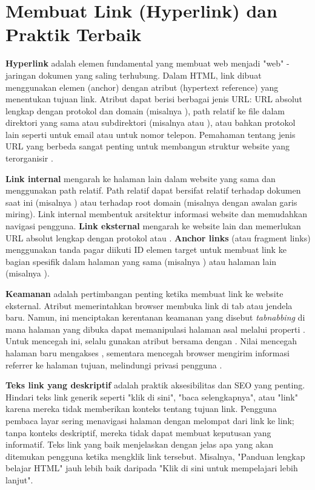 ﻿\section{Membuat Link (Hyperlink) dan Praktik Terbaik}

\textbf{Hyperlink} adalah elemen fundamental yang membuat web menjadi "web" - jaringan dokumen yang saling terhubung. Dalam HTML, link dibuat menggunakan elemen  (anchor) dengan atribut  (hypertext reference) yang menentukan tujuan link. Atribut  dapat berisi berbagai jenis URL: URL absolut lengkap dengan protokol dan domain (misalnya ), path relatif ke file dalam direktori yang sama atau subdirektori (misalnya  atau ), atau bahkan protokol lain seperti  untuk email atau  untuk nomor telepon. Pemahaman tentang jenis URL yang berbeda sangat penting untuk membangun struktur website yang terorganisir \cite{webdevHtml}.

\textbf{Link internal} mengarah ke halaman lain dalam website yang sama dan menggunakan path relatif. Path relatif dapat bersifat relatif terhadap dokumen saat ini (misalnya ) atau terhadap root domain (misalnya  dengan awalan garis miring). Link internal membentuk arsitektur informasi website dan memudahkan navigasi pengguna. \textbf{Link eksternal} mengarah ke website lain dan memerlukan URL absolut lengkap dengan protokol  atau . \textbf{Anchor links} (atau fragment links) menggunakan tanda pagar \code{\#} diikuti ID elemen target untuk membuat link ke bagian spesifik dalam halaman yang sama (misalnya ) atau halaman lain (misalnya ).

\textbf{Keamanan} adalah pertimbangan penting ketika membuat link ke website eksternal. Atribut  memerintahkan browser membuka link di tab atau jendela baru. Namun, ini menciptakan kerentanan keamanan yang disebut \textit{tabnabbing} di mana halaman yang dibuka dapat memanipulasi halaman asal melalui properti . Untuk mencegah ini, selalu gunakan atribut  bersama dengan . Nilai  mencegah halaman baru mengakses , sementara  mencegah browser mengirim informasi referrer ke halaman tujuan, melindungi privasi pengguna \cite{mdnHtmlIntro}.

\textbf{Teks link yang deskriptif} adalah praktik aksesibilitas dan SEO yang penting. Hindari teks link generik seperti "klik di sini", "baca selengkapnya", atau "link" karena mereka tidak memberikan konteks tentang tujuan link. Pengguna pembaca layar sering menavigasi halaman dengan melompat dari link ke link; tanpa konteks deskriptif, mereka tidak dapat membuat keputusan yang informatif. Teks link yang baik menjelaskan dengan jelas apa yang akan ditemukan pengguna ketika mengklik link tersebut. Misalnya, "Panduan lengkap belajar HTML" jauh lebih baik daripada "Klik di sini untuk mempelajari lebih lanjut".

